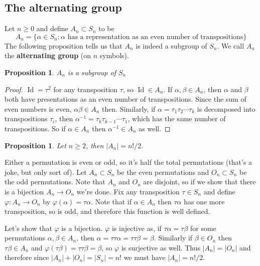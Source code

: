\documentclass[12pt]{article}
\numberwithin{equation}{subsection}
\newtheorem{prop}[subsection]{Proposition}
\theoremstyle{note}
\newcommand{\Id}{\operatorname{Id}}
\begin{document}
\subsection{The alternating group}

Let $n\geq 0$ and define $A_n\subset S_n$ to be \begin{equation} A_n=\{ \alpha\in S_n : \text{$\alpha$ has a representation as an even number of transpositions}\}\end{equation}
The following proposition tells us that $A_n$ is indeed a subgroup of $S_n$. We call $A_n$ the \textbf{alternating group} (on $n$ symbols). 
\begin{prop} $A_n$ is a subgroup of $S_n$
\end{prop}
\begin{proof} $\Id=\tau^{2}$ for any transposition $\tau$, so $\Id\in A_n$. If $\alpha,\beta \in A_n$, then $\alpha$ and $\beta$ both have presentations as an even number of transpositions. Since the sum of even numbers is even, $\alpha\beta\in A_n$ then. Similarly, if $\alpha=\tau_1\tau_2\cdots\tau_k$ is decomposed into transpositions $\tau_i$, then $\alpha^{-1}=\tau_k\tau_{k-1}\cdots\tau_1$, which has the same number of transpositions. So if $\alpha\in A_n$ then $\alpha^{-1}\in A_n$ as well. 
\end{proof}

\begin{prop} \label{order-of-An}
	Let $n\geq 2$, then $|A_n|=n!/2$.
\end{prop}

Either a permutation is even or odd, so it's half the total permutations (that's a joke, but only sort of).  Let $A_n\subset S_n$ be the even permutations and $O_n\subset S_n$ be the odd permutations. Note that $A_n$ and $O_n$ are disjoint, so if we show that there is a bijection $A_n\to O_n$ we're done. Fix any transposition $\tau\in S_n$ and define $\varphi\colon A_n\to O_n$ by $\varphi(\alpha)=\tau\alpha$. Note that if $\alpha\in A_n$ then $\tau\alpha$ has one more transposition, so is odd, and therefore this function is well defined. 

Let's show that $\varphi$ is a bijection. $\varphi$ is injective as, if $\tau\alpha=\tau\beta$ for some permutations $\alpha,\beta\in A_n$, then $\alpha=\tau\tau\alpha=\tau\tau\beta=\beta$. Similarly if $\beta\in O_n$ then $\tau\beta\in A_n$ and $\varphi(\tau\beta)=\tau\tau\beta=\beta$, so $\varphi$ is surjective as well. Thus $|A_n|=|O_n|$ and therefore since $|A_n|+|O_n|=|S_n|=n!$ we must have $|A_n|=n!/2$. 
\end{document}
